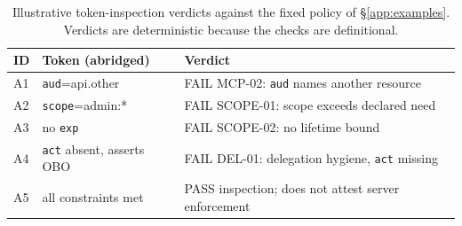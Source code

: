 \begin{table}[h]
\centering\footnotesize
\caption{Illustrative token-inspection verdicts against the fixed policy of
\S\ref{app:examples}. Verdicts are deterministic because the checks are definitional.}
\label{tab:examples}
\begin{tabular}{@{}llp{3.3cm}@{}}
\toprule
ID & Token (abridged) & Verdict \\
\midrule
A1 & \texttt{aud}=api.other & FAIL MCP-02: \texttt{aud} names another resource \\
A2 & \texttt{scope}=admin:* & FAIL SCOPE-01: scope exceeds declared need \\
A3 & no \texttt{exp} & FAIL SCOPE-02: no lifetime bound \\
A4 & \texttt{act} absent, asserts OBO & FAIL DEL-01: delegation hygiene, \texttt{act} missing \\
A5 & all constraints met & PASS inspection; does not attest server enforcement \\
\bottomrule
\end{tabular}
\end{table}
